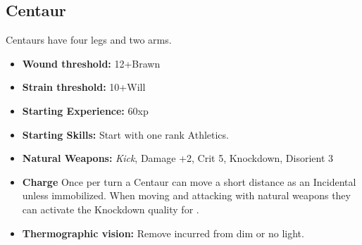 \documentclass{book}
\begin{document}
\begin{multicols}{2}
	
	\subsection{Centaur}
	Centaurs have four legs and two arms.
	
	\begin{itemize}
		\item \textbf{Wound threshold:} 12+Brawn
		\item \textbf{Strain threshold:} 10+Will
		\item \textbf{Starting Experience:} 60xp
		\item \textbf{Starting Skills:} Start with one rank Athletics.
		\item \textbf{Natural Weapons:} \textit{Kick}, Damage +2, Crit 5, Knockdown, Disorient 3
		\item \textbf{Charge} Once per turn a Centaur can move a short distance as an Incidental unless immobilized. When moving and attacking with natural weapons they can activate the Knockdown quality for \Advantage.
		\item \textbf{Thermographic vision:} Remove \SetbackDie \SetbackDie incurred from dim or no light.
	\end{itemize}
\end{multicols}
\mbox{ }
\end{document}
